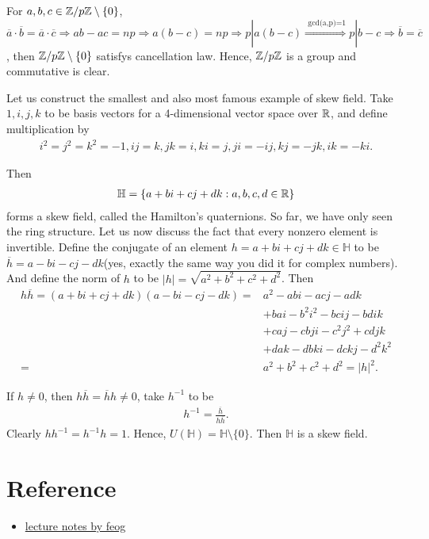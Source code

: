 For $a,b,c\in \mathbb{Z}/p\mathbb{Z}\setminus \{0\}$, $\overline{a}\cdot\overline{b}=\overline{a}\cdot\overline{c}\Rightarrow ab-ac=np\Rightarrow a(b-c)=np\Rightarrow p|a(b-c) \overset{\text{ gcd(a,p)=1}}{\Longrightarrow} p|b-c\Rightarrow \overline{b}=\overline{c}$, 
then $\mathbb{Z}/p\mathbb{Z}\setminus \{0\}$ satisfys cancellation law.
Hence, $\mathbb{Z}/p\mathbb{Z}$ is a group and commutative is clear.


Let us construct the smallest and also most famous example of skew field. 
Take $1,i,j,k$ to be basis vectors for a 4-dimensional vector space over $\mathbb{R}$, 
and define multiplication by
\begin{align*}
    i^2=j^2=k^2=-1,ij=k,jk=i,ki=j,ji=-ij,kj=-jk,ik=-ki.
\end{align*}

Then 
\begin{align*}
    \mathbb H = \{a+bi+cj+dk:a,b,c,d\in\mathbb{R}\}
\end{align*}
forms a skew field, called the Hamilton's quaternions. So far, we have
only seen the ring structure. Let us now discuss the fact that every nonzero element is invertible.  
Define the conjugate of an element $h=a+bi+cj+dk\in\mathbb{H}$ to be $\overline{h}=a-bi-cj-dk$(yes, exactly the same way you did it for complex numbers). 
And define the norm of $h$ to be $|h|=\sqrt{a^2+b^2+c^2+d^2}$.
Then
\begin{align*}
    h\overline{h} = (a+bi+cj+dk)(a-bi-cj-dk)=&a^2-abi-acj-adk\\
                                             &+bai-b^2i^2-bcij-bdik\\
                                             &+caj-cbji-c^2j^2+cdjk\\
                                             &+dak-dbki-dckj-d^2k^2\\
                                            =& a^2+b^2+c^2+d^2=|h|^2.
\end{align*}

If $h\neq 0$, then $h\overline{h}=\overline{h}h\neq 0$, take $h^{-1}$ to be
\begin{align*}
    h^{-1} = \frac{\overline{h}}{h\overline{h}}.
\end{align*}
Clearly $hh^{-1}=h^{-1}h=1$. Hence, $U(\mathbb{H})=\mathbb{H}\setminus \{0\}$. 
Then $\mathbb{H}$ is a skew field.

\section{Reference}
\begin{itemize}
    \item \href{https://feog.github.io/ring.pdf}{lecture notes by feog}
\end{itemize}

